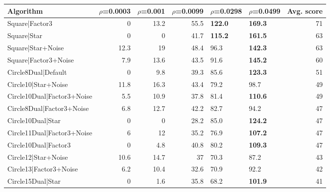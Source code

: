 \begin{tabular}{lrrrllr}
\hline
 Algorithm                  &   $\rho$=0.0003 &   $\rho$=0.001 &   $\rho$=0.0099 & $\rho$=0.0298   & $\rho$=0.0499   &   Avg. score \\
\hline
 Square|Factor3             &             0   &           13.2 &            55.5 & \textbf{122.0}  & \textbf{169.3}  &           71 \\
 Square|Star                &             0   &            0   &            41.7 & \textbf{115.2}  & \textbf{161.5}  &           63 \\
 Square|Star+Noise          &            12.3 &           19   &            48.4 & 96.3            & \textbf{142.3}  &           63 \\
 Square|Factor3+Noise       &             7.9 &           13.6 &            43.5 & 91.6            & \textbf{145.2}  &           60 \\
 Circle8Dual|Default        &             0   &            9.8 &            39.3 & 85.6            & \textbf{123.3}  &           51 \\
 Circle10|Star+Noise        &            11.8 &           16.3 &            43.4 & 79.2            & 98.7            &           49 \\
 Circle10Dual|Factor3+Noise &             5.5 &           10.9 &            37.8 & 81.4            & \textbf{110.6}  &           49 \\
 Circle8Dual|Factor3+Noise  &             6.8 &           12.7 &            42.2 & 82.7            & 94.2            &           47 \\
 Circle10Dual|Star          &             0   &            0   &            28.2 & 85.0            & \textbf{124.2}  &           47 \\
 Circle11Dual|Factor3+Noise &             6   &           12   &            35.2 & 76.9            & \textbf{107.2}  &           47 \\
 Circle10Dual|Factor3       &             0   &            4.8 &            40.8 & 80.2            & \textbf{109.3}  &           47 \\
 Circle12|Star+Noise        &            10.6 &           14.7 &            37   & 70.3            & 87.2            &           43 \\
 Circle13|Factor3+Noise     &             6.2 &           10.4 &            32.6 & 70.9            & 92.2            &           42 \\
 Circle15Dual|Star          &             0   &            1.6 &            35.8 & 68.2            & \textbf{101.9}  &           41 \\

\end{tabular}
